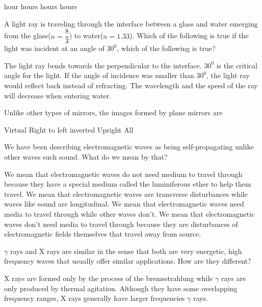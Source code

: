 \documentclass[12pt,addpoints]{exam}
\begin{document}
{{{\begin{questions}
					\begin{oneparchoices}
						 hour
						 hours
						 hours
						 hours
					\end{oneparchoices}
					\question A light ray is traveling through the interface between a glass and water emerging from the glass($n=\dfrac{8}{3}$) to water($n=1.33$). Which of the following is true if the light was incident at an angle of $30^0$, which of the following is true?
					\begin{choices}
						\choice The light ray bends towards the perpendicular to the interface.
						\choice $30^0$ is the critical angle for the light.
						\choice If the angle of incidence was smaller than $30^0$, the light ray would reflect back instead of refracting.
						\choice The wavelength and the speed of the ray will decrease when entering water.
					\end{choices}
					\question Unlike other types of mirrors, the images formed by plane mirrors are \\
					\begin{oneparchoices}
						\choice Virtual
						\choice Right to left inverted
						\choice Upright
						\choice All
					\end{oneparchoices}
					\question We have been describing electromagnetic waves as being self-propagating unlike other waves such sound. What do we mean by that?
					\begin{choices}
						\choice We mean that electromagnetic waves do not need medium to travel through because they have a special medium called the luminiferous ether to help them travel.
						\choice We mean that electromagnetic waves are transverse disturbances while waves like sound are longitudinal.
						\choice We mean that electromagnetic waves need media to travel through while other waves don't.
						\choice We mean that electromagnetic waves don't need media to travel through because they are disturbances of electromagnetic fields themselves that travel away from source.
					\end{choices}
					\question $\gamma$ rays and X rays are similar in the sense that both are very energetic, high frequency waves that usually offer similar applications. How are they different?
					\begin{choices}
						\choice X rays are formed only by the process of the bremsstrahlung while $\gamma$ rays are only produced by thermal agitation.
						\choice Although they have some overlapping frequency ranges, X rays generally have larger frequencies $\gamma$ rays.

\end{choices}
\end{questions}}}}
\end{document}
